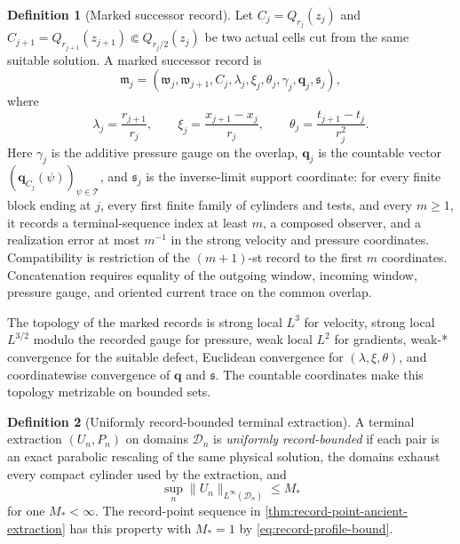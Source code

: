 \documentclass[11pt]{amsart}
\numberwithin{equation}{section}
\theoremstyle{plain}
\theoremstyle{definition}
\newtheorem{definition}[definition]{Definition}
\theoremstyle{remark}
\begin{document}
\begin{definition}[Marked successor record]
\label{def:marked-successor-record}
Let \(C_j=Q_{r_j}(z_j)\) and
\(C_{j+1}=Q_{r_{j+1}}(z_{j+1})\Subset Q_{r_j/2}(z_j)\) be two actual cells cut from the
same suitable solution.  A marked successor record is
\begin{equation}\label{eq:marked-successor-tuple}
 \mathfrak m_j=
 (\mathfrak w_j,\mathfrak w_{j+1},C_j,
   \lambda_j,\xi_j,\theta_j,\gamma_j,
   \mathbf q_j,\mathfrak s_j),
\end{equation}
where
\begin{equation}\label{eq:marked-observer-increments}
 \lambda_j=\frac{r_{j+1}}{r_j},\qquad
 \xi_j=\frac{x_{j+1}-x_j}{r_j},\qquad
 \theta_j=\frac{t_{j+1}-t_j}{r_j^2}.
\end{equation}
Here \(\gamma_j\) is the additive pressure gauge on the overlap,
\(\mathbf q_j\) is the countable vector
\((\mathbf q_{C_j}(\psi))_{\psi\in\mathscr T}\), and
\(\mathfrak s_j\) is the inverse-limit support coordinate: for every finite
block ending at \(j\), every first finite family of cylinders and tests, and
every \(m\ge1\), it records a terminal-sequence index at least \(m\), a
composed observer, and a realization error at most \(m^{-1}\) in the strong
velocity and pressure coordinates.  Compatibility is restriction of the
\((m+1)\)-st record to the first \(m\) coordinates.  Concatenation
requires equality of the outgoing window, incoming window, pressure gauge,
and oriented current trace on the common overlap.
\end{definition}

The topology of the marked records is strong local \(L^3\) for velocity,
strong local \(L^{3/2}\) modulo the recorded gauge for pressure, weak local
\(L^2\) for gradients, weak-* convergence for the suitable defect, Euclidean
convergence for \((\lambda,\xi,\theta)\), and coordinatewise convergence of
\(\mathbf q\) and \(\mathfrak s\).  The countable coordinates make this
topology metrizable on bounded sets.

\begin{definition}[Uniformly record-bounded terminal extraction]
\label{def:record-bounded-terminal-extraction}
A terminal extraction \((U_n,P_n)\) on domains \(\mathcal D_n\) is
\emph{uniformly record-bounded} if each pair is an exact parabolic rescaling
of the same physical solution, the domains exhaust every compact cylinder
used by the extraction, and
\begin{equation}\label{eq:uniform-record-bound}
 \sup_n\|U_n\|_{L^\infty(\mathcal D_n)}\le M_*
\end{equation}
for one \(M_*<\infty\).  The record-point sequence in
\cref{thm:record-point-ancient-extraction} has this property with \(M_*=1\)
by \eqref{eq:record-profile-bound}.
\end{definition}
\end{document}

